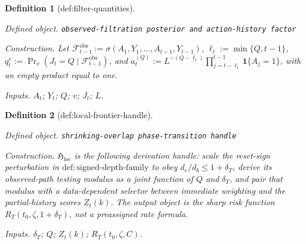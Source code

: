 \documentclass{article}
\newtheorem{definition}{Definition}
\begin{document}
\begin{definition}[def:filter-quantities]\label{def:filter-quantities}
\par\smallskip\noindent\emph{Defined object.} \texttt{observed-\allowbreak{}filtration posterior and action-\allowbreak{}history factor}
\par\smallskip\noindent\emph{Construction.} Let \(\mathcal F_{t-1}^{\mathrm{obs}}:=\sigma(A_1,Y_1,\ldots,A_{t-1},Y_{t-1})\), \(\ell_t:=\min\{Q,t-1\}\), \(q_t^v:=\Pr_v(J_t=Q\mid\mathcal F_{t-1}^{\mathrm{obs}})\), and \(a_t^{(Q)}:=L^{-(Q-\ell_t)}\prod_{j=t-\ell_t}^{t-1}\mathbf 1\{A_j=1\}\), with an empty product equal to one.
\par\smallskip\noindent\emph{Inputs.} \(A_t\); \(Y_t\); \(Q\); \(v\); \(J_t\); \(L\).
\end{definition}

\begin{definition}[def:local-frontier-handle]\label{def:local-frontier-handle}
\par\smallskip\noindent\emph{Defined object.} \texttt{shrinking-\allowbreak{}overlap phase-\allowbreak{}transition handle}
\par\smallskip\noindent\emph{Construction.} \(\mathfrak H_{\mathrm{loc}}\) is the following derivation handle: scale the reset-sign perturbation in \(\mathrm{def{:}signed\text{-}depth\text{-}family}\) to obey \(d_e/d_b\le1+\delta_T\), derive its observed-path testing modulus as a joint function of \(Q\) and \(\delta_T\), and pair that modulus with a data-dependent selector between immediate weighting and the partial-history scores \(Z_t(k)\). The output object is the sharp risk function \(R_T(t_0,\zeta,1+\delta_T)\), not a preassigned rate formula.
\par\smallskip\noindent\emph{Inputs.} \(\delta_T\); \(Q\); \(Z_t(k)\); \(R_T(t_0,\zeta,C)\).
\end{definition}
\end{document}
